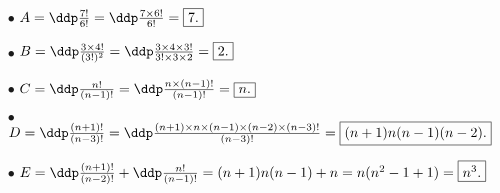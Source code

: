 
\begin{correction}  \; \vsec
\begin{itemize}
\item[$\bullet$] $A=\ddp\frac{7!}{6!}=\ddp\frac{7\times 6!}{6!}=\fbox{$7.$}$
\item[$\bullet$] $B=\ddp\frac{3\times 4!}{(3!)^2}=\ddp\frac{3\times 4\times 3!}{3!\times 3\times 2}=\fbox{$2$.}$
\item[$\bullet$] $C=\ddp\frac{n!}{(n-1)!}=\ddp\frac{n\times (n-1)!}{(n-1)!}=\fbox{$n$.}$
\item[$\bullet$] $D=\ddp\frac{(n+1)!}{(n-3)!}=\ddp\frac{(n+1)\times n\times (n-1)\times (n-2)\times (n-3)!}{(n-3)!}=\fbox{$(n+1) n (n-1) (n-2)$.}$
\item[$\bullet$] $E=\ddp\frac{(n+1)!}{(n-2)!}+\ddp\frac{n!}{(n-1)!}=(n+1)n(n-1)+n=n(n^2-1+1)=\fbox{$n^3$.}$
\end{itemize}
\end{correction}